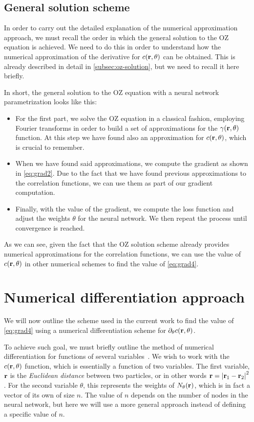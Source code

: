 \subsection{General solution scheme}
In order to carry out the detailed explanation of the numerical approximation approach,
we must recall the order in which the general solution to the OZ equation is achieved.
We need to do this in order to understand how the numerical approximation of the derivative
for $c(\mathbf{r}, \theta)$ can be obtained.
This is already described in detail in \autoref{subsec:oz-solution}, but
we need to recall it here briefly.

In short, the general solution to the OZ equation with a neural network 
parametrization looks like this:

\begin{itemize}
    \item For the first part, we solve the OZ equation in a classical fashion, employing Fourier transforms in order to build a set of approximations for the $\gamma(\mathbf{r}, \theta)$ function. At this step we have found also an approximation for $c(\mathbf{r}, \theta)$, which is crucial to remember.
    \item When we have found said approximations, we compute the gradient as shown in \autoref{eq:grad2}. Due to the fact that we have found previous approximations to the correlation functions, we can use them as part of our gradient computation.
    \item Finally, with the value of the gradient, we compute the loss function and adjust the weights $\theta$ for the neural network. We then repeat the process until convergence is reached.
\end{itemize}

As we can see, given the fact that the OZ solution scheme already provides numerical
approximations for the correlation functions, we can use the value of $c(\mathbf{r}, \theta)$
in other numerical schemes to find the value of \autoref{eq:grad4}.

\section{Numerical differentiation approach}
We will now outline the scheme used in the current work to find the value of 
\autoref{eq:grad4} using a numerical differentiation scheme for
$\partial_{\theta} c(\mathbf{r}, \theta)$.

To achieve such goal, we must briefly outline the method of numerical differentiation
for functions of several variables~\cite{hammingNumericalMethodsScientists2012}.
We wish to work with the $c(\mathbf{r}, \theta)$ function, which is essentially a function of
two variables. The first variable, $\mathbf{r}$ is the \emph{Euclidean distance}
between two particles, or in other words $\mathbf{r}={\lvert \mathbf{r}_1 - \mathbf{r}_2 \rvert}^2$.
For the second variable $\theta$, this represents the weights of $N_{\theta}(\mathbf{r})$, which is
in fact a vector of its own of size $n$. The value of $n$ depends on the number of
nodes in the neural network, but here we will use a more general approach instead of
defining a specific value of $n$.

